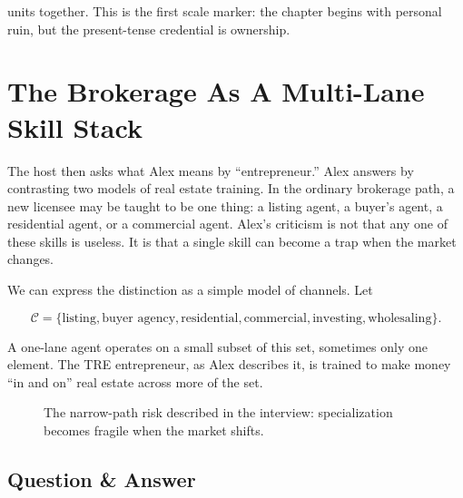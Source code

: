 units together. This is the first scale marker: the chapter begins with personal ruin, but the present-tense credential is ownership.

\section{The Brokerage As A Multi-Lane Skill Stack}

The host then asks what Alex means by ``entrepreneur.'' Alex answers by contrasting two models of real estate training. In the ordinary brokerage path, a new licensee may be taught to be one thing: a listing agent, a buyer's agent, a residential agent, or a commercial agent. Alex's criticism is not that any one of these skills is useless. It is that a single skill can become a trap when the market changes.

We can express the distinction as a simple model of channels. Let

\begin{equation}
\mathcal{C}
=
\{\text{listing},\text{buyer agency},\text{residential},\text{commercial},\text{investing},\text{wholesaling}\}.
\end{equation}

A one-lane agent operates on a small subset of this set, sometimes only one element. The TRE entrepreneur, as Alex describes it, is trained to make money ``in and on'' real estate across more of the set.

\begin{figure}
\centering
{}
\caption{The narrow-path risk described in the interview: specialization becomes fragile when the market shifts.}
\end{figure}

\subsection{Question \& Answer}

